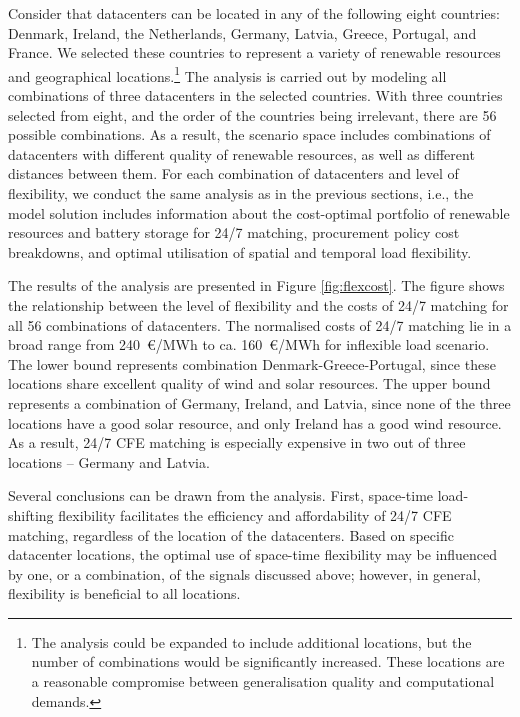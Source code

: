 Consider that datacenters can be located in any of the following eight countries: Denmark, Ireland, the Netherlands, Germany, Latvia, Greece, Portugal, and France. We selected these countries to represent a variety of renewable resources and geographical locations.\footnote{The analysis could be expanded to include additional locations, but the number of combinations would be significantly increased. These locations are a reasonable compromise between generalisation quality and computational demands.} The analysis is carried out by modeling all combinations of three datacenters in the selected countries. With three countries selected from eight, and the order of the countries being irrelevant, there are 56 possible combinations. As a result, the scenario space includes combinations of datacenters with different quality of renewable resources, as well as different distances between them. 
For each combination of datacenters and level of flexibility, we conduct the same analysis as in the previous sections, i.e., the model solution includes information about the cost-optimal portfolio of renewable resources and battery storage for 24/7 matching, procurement policy cost breakdowns, and optimal utilisation of spatial and temporal load flexibility.

The results of the analysis are presented in Figure \ref{fig:flexcost}. The figure shows the relationship between the level of flexibility and the costs of 24/7 matching for all 56 combinations of datacenters. The normalised costs of 24/7 matching lie in a broad range from 240~\euro/MWh to ca. 160~\euro/MWh for inflexible load scenario. The lower bound represents combination Denmark-Greece-Portugal, since these locations share excellent quality of wind and solar resources. The upper bound represents a combination of Germany, Ireland, and Latvia, since none of the three locations have a good solar resource, and only Ireland has a good wind resource.  As a result, 24/7 CFE matching is especially expensive in two out of three locations -- Germany and Latvia. 

Several conclusions can be drawn from the analysis. First, space-time load-shifting flexibility facilitates the efficiency and affordability of 24/7 CFE matching, regardless of the location of the datacenters. Based on specific datacenter locations, the optimal use of space-time flexibility may be influenced by one, or a combination, of the signals discussed above; however, in general, flexibility is beneficial to all locations.

